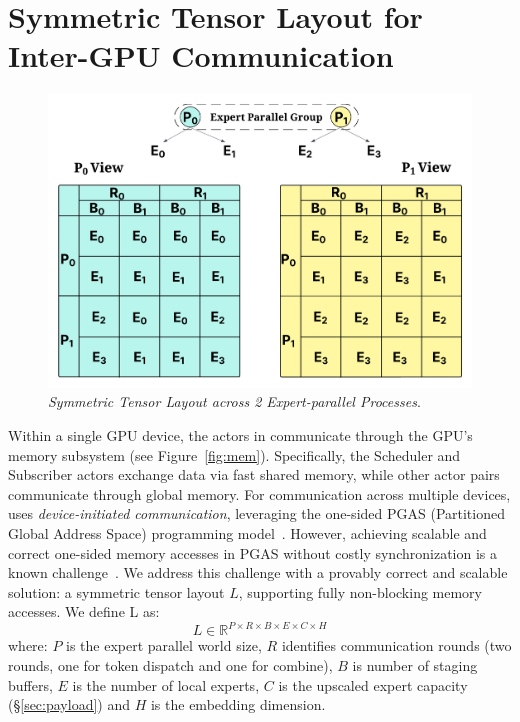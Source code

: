 \section{Symmetric Tensor Layout for Inter-GPU Communication}\label{sec:symmetric-tensor-layout}
\begin{figure}[!ht]
    \centering
    \includegraphics[width=0.85\linewidth, keepaspectratio]{figures/mem_layout}
    \caption{\emph{Symmetric Tensor Layout across 2 Expert-parallel Processes}.}
    \label{fig:mem_layout}
\end{figure}
Within a single GPU device, the actors in \sysname communicate through the GPU's memory subsystem (see Figure~\ref{fig:mem}).
Specifically, the Scheduler and Subscriber actors exchange data via fast shared memory, while other actor
pairs communicate through global memory.
For communication across multiple devices, \sysname uses \emph{device-initiated communication},
leveraging the one-sided PGAS (Partitioned Global Address Space) programming model~\cite{10.1145/1278177.1278183}.
However, achieving scalable and correct one-sided memory accesses in PGAS without costly synchronization
is a known challenge~\cite{deepep, triton-dist}.
We address this challenge with a provably correct and scalable solution: a symmetric tensor layout $L$,
supporting fully non-blocking memory accesses.
We define L as:\\
\[
    L \in \mathbb{R}^{P\times R \times B \times E \times C \times H}
\]
where: $P$ is the expert parallel world size, $R$ identifies communication rounds
(two rounds, one for token dispatch and one for combine), $B$ is number of staging buffers,
$E$ is the number of local experts, $C$ is the upscaled expert capacity (\S\ref{sec:payload})
and $H$ is the embedding dimension.
